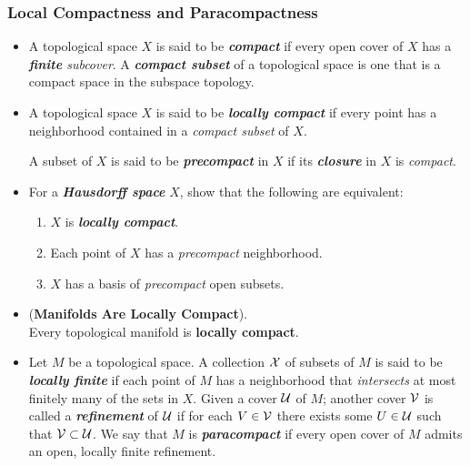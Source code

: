 \documentclass[11pt]{article}
\begin{document}
\subsubsection{Local Compactness and Paracompactness}
\begin{itemize}
\item \begin{definition}
A topological space $X$ is said to be \emph{\textbf{compact}} if every open cover of $X$ has a \emph{\textbf{finite} subcover}. A \emph{\textbf{compact subset}} of a topological space is one that is a compact space in the subspace topology. 
\end{definition}

\item \begin{definition}
A topological space $X$ is said to be \emph{\textbf{locally compact}} if every point has a neighborhood contained in a \emph{compact subset} of $X$. 

A subset of $X$ is said to be \emph{\textbf{precompact}} in $X$ if its \emph{\textbf{closure}} in $X$ is \emph{compact}.
\end{definition}

\item For a \emph{\textbf{Hausdorff space}} $X$, show that the following are equivalent:
\begin{enumerate}
\item $X$ is \emph{\textbf{locally compact}}.
\item Each point of $X$ has a \emph{precompact} neighborhood. 
\item $X$ has a basis of \emph{precompact} open subsets.
\end{enumerate}

\item 
\begin{proposition} (\textbf{Manifolds Are Locally Compact}).\\
Every topological manifold is \textbf{locally compact}.
\end{proposition}

\item Let $M$ be a topological space. A collection ${\mathcal X}$ of subsets of $M$ is said to be \emph{\textbf{locally finite}} if each point of $M$ has a neighborhood that \emph{intersects} at most finitely many of the sets in $X$. Given a cover ${\mathcal U}$ of $M$; another cover ${\mathcal V}$ is called a \emph{\textbf{refinement}} of ${\mathcal U}$ if for each $V \in {\mathcal V}$ there exists some $U \in {\mathcal U}$ such that ${\mathcal V} \subset {\mathcal U}$. We say that $M$ is \emph{\textbf{paracompact}} if every open cover of $M$ admits an open, locally finite refinement.


\end{itemize}
\end{document}
